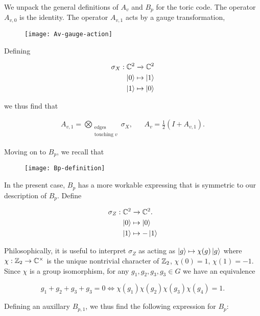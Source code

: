 We unpack the general definitions of $A_v$ and $B_p$ for the toric code. The operator $A_{v,0}$ is the identity. The operator $A_{v,1}$ acts by a gauge transformation,

\begin{figure}[h]
\begin{center}
\texttt{[image: Av-gauge-action]}
\end{center}
\end{figure}

Defining

\begin{align*}
\sigma_X:\mathbb{C}^2&\xrightarrow{}\mathbb{C}^2\\
\ket{0}&\mapsto \ket{1}\\
\ket{1}&\mapsto \ket{0}
\end{align*}

we thus find that

\begin{align*}
A_{v,1}=\bigotimes_{\substack{\text{edges} \\ \text{touching }v}}\sigma_X, && A_v=\frac{1}{2}\left(I + A_{v,1}\right).
\end{align*}

Moving on to $B_p$, we recall that

\begin{figure}[h]
\begin{center}
\texttt{[image: Bp-definition]}
\end{center}
\end{figure}

In the present case, $B_p$ has a more workable expressing that is symmetric to our description of $B_p$. Define

\begin{align*}
\sigma_Z:\mathbb{C}^2&\xrightarrow{}\mathbb{C}^2.\\
\ket{0}&\mapsto \ket{0}\\
\ket{1}&\mapsto -\ket{1}
\end{align*}

Philosophically, it is useful to interpret $\sigma_Z$ as acting as $\ket{g}\mapsto \chi(g)\ket{g}$ where $\chi:\mathbb{Z}_2\to\mathbb{C}^\times$ is the unique nontrivial character of $\mathbb{Z}_2$, $\chi(0)=1$, $\chi(1)=-1$. Since $\chi$ is a group isomorphism, for any $g_1,g_2,g_3,g_3\in G$ we have an equivalence

$$g_1+g_2+g_3+g_3=0 \iff \chi(g_1)\chi(g_2)\chi(g_3)\chi(g_4)=1.$$

Defining an auxillary $B_{p,1}$, we thus find the following expression for $B_p$:

